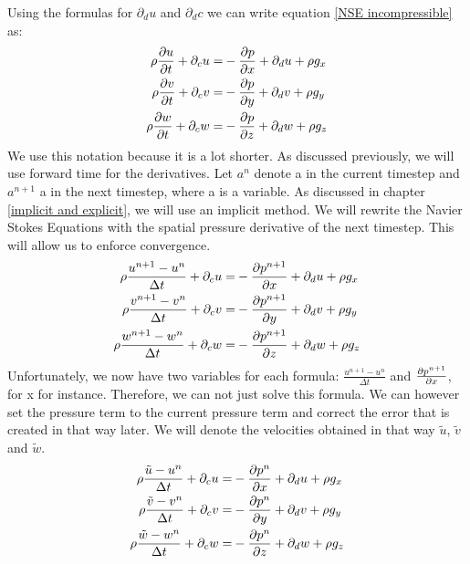 \documentclass{article}
\begin{document}
Using the formulas for \(\partial _du\) and \(\partial _dc\) we can write equation \ref{NSE incompressible} as\cite{MAC}:
\begin{equation}
\begin{split}
  \rho \pdv{u}{t} + \partial _cu=&-\pdv{p}{x}+\partial _du + \rho g_x\\
  \rho \pdv{v}{t} + \partial _cv=&-\pdv{p}{y}+\partial _dv + \rho g_y\\
  \rho \pdv{w}{t} + \partial _cw=&-\pdv{p}{z}+\partial _dw + \rho g_z
\end{split}
\end{equation}\label{short NSE}
We use this notation because it is a lot shorter. As discussed previously, we will use forward time for the derivatives. Let \(a^n\) denote a in the current timestep and \(a^{n+1}\) a in the next timestep, where a is a variable. As discussed in chapter \ref{implicit and explicit}, we will use an implicit method. We will rewrite the Navier Stokes Equations with the spatial pressure derivative of the next timestep. This will allow us to enforce convergence. \cite{MAC}
\begin{equation}
\begin{split}
  \rho \frac{u^{n+1}-u^n}{\Delta t} + \partial _cu=&-\pdv{p^{n+1}}{x}+\partial _du + \rho g_x\\
  \rho \frac{v^{n+1}-v^n}{\Delta t} + \partial _cv=&-\pdv{p^{n+1}}{y}+\partial _dv + \rho g_y\\
  \rho \frac{w^{n+1}-w^n}{\Delta t} + \partial _cw=&-\pdv{p^{n+1}}{z}+\partial _dw + \rho g_z
\end{split}\label{time discretised NSE}
\end{equation} 
Unfortunately, we now have two variables for each formula: \(\frac{u^{n+1}-u^n}{\Delta t}\) and \(\pdv{p^{n+1}}{x}\), for x for instance. Therefore, we can not just solve this formula. We can however set the pressure term to the current pressure term and correct the error that is created in that way later. We will denote the velocities obtained in that way \(\tilde{u}\), \(\tilde{v}\) and \(\tilde{w}\)\cite{MAC}.
\begin{equation}
\begin{split}
  \rho \frac{\tilde{u}-u^n}{\Delta t} + \partial _cu=&-\pdv{p^{n}}{x}+\partial _du + \rho g_x\\
  \rho \frac{\tilde{v}-v^n}{\Delta t} + \partial _cv=&-\pdv{p^{n}}{y}+\partial _dv + \rho g_y\\
  \rho \frac{\tilde{w}-w^n}{\Delta t} + \partial _cw=&-\pdv{p^{n}}{z}+\partial _dw + \rho g_z
\end{split}\label{guess NSE}
\end{equation} 
\end{document}
